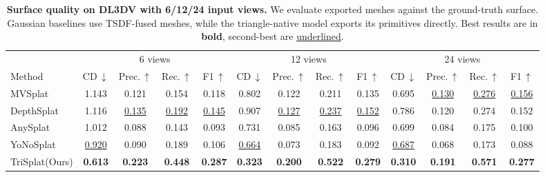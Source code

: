 \documentclass{llmxive}
\providecommand{\method}{TriSplat\xspace}
\providecommand{\arraystretch}{0.94}
\begin{document}
\begin{table}[t]
\centering
{\footnotesize
\setlength{\tabcolsep}{4.0pt}
\renewcommand{\arraystretch}{0.94}
\begin{tabular*}{0.96\textwidth}{@{\extracolsep{\fill}}l|cccc|cccc|cccc@{}}
\toprule
& \multicolumn{4}{c|}{6 views} & \multicolumn{4}{c|}{12 views} & \multicolumn{4}{c}{24 views} \\
Method & CD\,$\downarrow$ & Prec.\,$\uparrow$ & Rec.\,$\uparrow$ & F1\,$\uparrow$ & CD\,$\downarrow$ & Prec.\,$\uparrow$ & Rec.\,$\uparrow$ & F1\,$\uparrow$ & CD\,$\downarrow$ & Prec.\,$\uparrow$ & Rec.\,$\uparrow$ & F1\,$\uparrow$ \\
\midrule
MVSplat
& 1.143 & 0.121 & 0.154 & 0.118
& 0.802 & 0.122 & 0.211 & 0.135
& 0.695 & \underline{0.130} & \underline{0.276} & \underline{0.156} \\
DepthSplat
& 1.116 & \underline{0.135} & \underline{0.192} & \underline{0.145}
& 0.907 & \underline{0.127} & \underline{0.237} & \underline{0.152}
& 0.786 & 0.120 & 0.274 & 0.152 \\
AnySplat
& 1.012 & 0.088 & 0.143 & 0.093
& 0.731 & 0.085 & 0.163 & 0.096
& 0.699 & 0.084 & 0.175 & 0.100 \\
YoNoSplat
& \underline{0.920} & 0.090 & 0.189 & 0.106
& \underline{0.664} & 0.073 & 0.183 & 0.092
& \underline{0.687} & 0.068 & 0.173 & 0.088 \\
\midrule
\method (Ours)
& \textbf{0.613} & \textbf{0.223} & \textbf{0.448} & \textbf{0.287}
& \textbf{0.323} & \textbf{0.200} & \textbf{0.522} & \textbf{0.279}
& \textbf{0.310} & \textbf{0.191} & \textbf{0.571} & \textbf{0.277} \\
\bottomrule
\end{tabular*}
}
\caption{\textbf{Surface quality on DL3DV with 6/12/24 input views.} We evaluate exported meshes against the ground-truth surface. Gaussian baselines use TSDF-fused meshes, while the triangle-native model exports its primitives directly. Best results are in \textbf{bold}, second-best are \underline{underlined}.}
\label{tab:main_dl3dv_surface}
\end{table}
\end{document}
